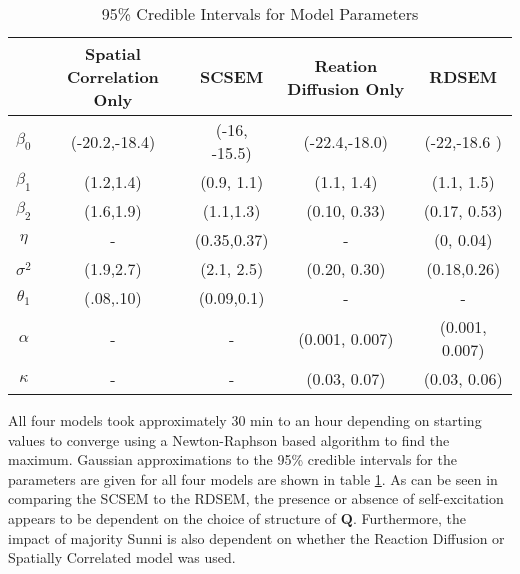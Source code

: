 \documentclass[11pt]{isuthesis}
\begin{document}
\begin{table}[h]
	\caption {95\% Credible Intervals for Model Parameters} \label{tab:params} 
	\begin{center}
		\begin{tabular}{ |c|c|c|c|c| } 
			\hline
			& Spatial Correlation Only & SCSEM & Reation Diffusion Only & RDSEM \\
			\hline 
			$\beta_0$&(-20.2,-18.4) &(-16, -15.5) &(-22.4,-18.0) &(-22,-18.6 )\\
			$\beta_1$& (1.2,1.4)&(0.9, 1.1) &(1.1, 1.4) &(1.1, 1.5)\\
			$\beta_2$& (1.6,1.9)&(1.1,1.3) &(0.10, 0.33) &(0.17, 0.53)\\
			$\eta$& - &(0.35,0.37) & -  &(0, 0.04)\\
			$\sigma^2$&(1.9,2.7) &(2.1, 2.5) & (0.20, 0.30)&(0.18,0.26)\\
			$\theta_1$&(.08,.10) &(0.09,0.1) & - & - \\
			$\alpha$& - & - & (0.001, 0.007) &(0.001, 0.007)\\
			$\kappa$& - & - & (0.03, 0.07) &(0.03, 0.06) \\
			\hline
		\end{tabular}
	\end{center}
\end{table}


All four models took approximately 30 min to an hour depending on starting values to converge using a Newton-Raphson based algorithm to find the maximum.  Gaussian approximations to the 95\% credible intervals for the parameters are given for all four models are shown in table \ref{tab:params}.  As can be seen in comparing the SCSEM to the RDSEM, the presence or absence of self-excitation appears to be dependent on the choice of structure of $\boldsymbol{Q}$.  Furthermore, the impact of majority Sunni is also dependent on whether the Reaction Diffusion or Spatially Correlated model was used.
\end{document}
